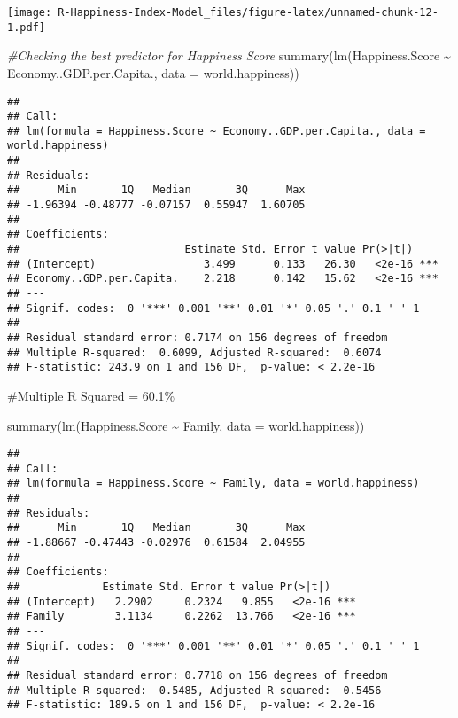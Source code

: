 \documentclass[
]{article}
\newenvironment{Shaded}{\begin{snugshade}}{\end{snugshade}}
\newcommand{\AttributeTok}[1]{\textcolor[rgb]{0.77,0.63,0.00}{#1}}
\newcommand{\CommentTok}[1]{\textcolor[rgb]{0.56,0.35,0.01}{\textit{#1}}}
\newcommand{\FunctionTok}[1]{\textcolor[rgb]{0.00,0.00,0.00}{#1}}
\newcommand{\NormalTok}[1]{#1}
\newcommand{\SpecialCharTok}[1]{\textcolor[rgb]{0.00,0.00,0.00}{#1}}
\begin{document}
\texttt{[image: R-Happiness-Index-Model\_files/figure-latex/unnamed-chunk-12-1.pdf]}

\begin{Shaded}
\begin{Highlighting}[]
\CommentTok{\#Checking the best predictor for Happiness Score}
\FunctionTok{summary}\NormalTok{(}\FunctionTok{lm}\NormalTok{(Happiness.Score }\SpecialCharTok{\textasciitilde{}}\NormalTok{ Economy..GDP.per.Capita., }\AttributeTok{data =}\NormalTok{ world.happiness))}
\end{Highlighting}
\end{Shaded}

\begin{verbatim}
## 
## Call:
## lm(formula = Happiness.Score ~ Economy..GDP.per.Capita., data = world.happiness)
## 
## Residuals:
##      Min       1Q   Median       3Q      Max 
## -1.96394 -0.48777 -0.07157  0.55947  1.60705 
## 
## Coefficients:
##                          Estimate Std. Error t value Pr(>|t|)    
## (Intercept)                 3.499      0.133   26.30   <2e-16 ***
## Economy..GDP.per.Capita.    2.218      0.142   15.62   <2e-16 ***
## ---
## Signif. codes:  0 '***' 0.001 '**' 0.01 '*' 0.05 '.' 0.1 ' ' 1
## 
## Residual standard error: 0.7174 on 156 degrees of freedom
## Multiple R-squared:  0.6099, Adjusted R-squared:  0.6074 
## F-statistic: 243.9 on 1 and 156 DF,  p-value: < 2.2e-16
\end{verbatim}

\#Multiple R Squared = 60.1\%

\begin{Shaded}
\begin{Highlighting}[]
\FunctionTok{summary}\NormalTok{(}\FunctionTok{lm}\NormalTok{(Happiness.Score }\SpecialCharTok{\textasciitilde{}}\NormalTok{ Family, }\AttributeTok{data =}\NormalTok{ world.happiness))}
\end{Highlighting}
\end{Shaded}

\begin{verbatim}
## 
## Call:
## lm(formula = Happiness.Score ~ Family, data = world.happiness)
## 
## Residuals:
##      Min       1Q   Median       3Q      Max 
## -1.88667 -0.47443 -0.02976  0.61584  2.04955 
## 
## Coefficients:
##             Estimate Std. Error t value Pr(>|t|)    
## (Intercept)   2.2902     0.2324   9.855   <2e-16 ***
## Family        3.1134     0.2262  13.766   <2e-16 ***
## ---
## Signif. codes:  0 '***' 0.001 '**' 0.01 '*' 0.05 '.' 0.1 ' ' 1
## 
## Residual standard error: 0.7718 on 156 degrees of freedom
## Multiple R-squared:  0.5485, Adjusted R-squared:  0.5456 
## F-statistic: 189.5 on 1 and 156 DF,  p-value: < 2.2e-16
\end{verbatim}
\end{document}
